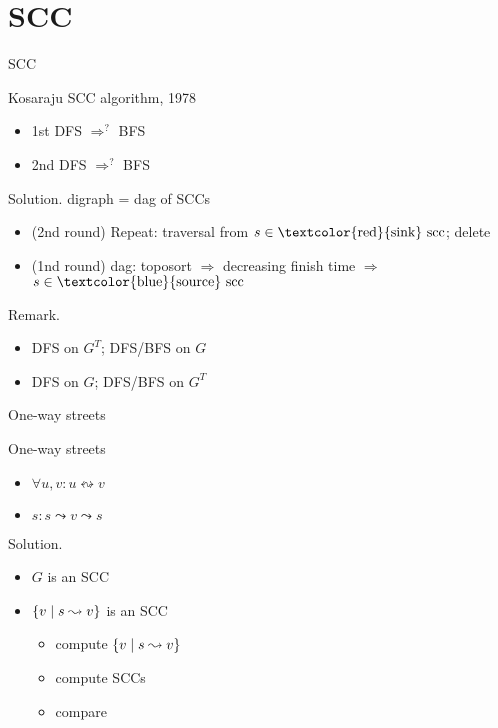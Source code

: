 \section{SCC}

\begin{frame}{SCC}
  \begin{exampleblock}{Kosaraju SCC algorithm, 1978 }
    \begin{itemize}
      \item 1st DFS $\Rightarrow^{?}$ BFS
      \item 2nd DFS $\Rightarrow^{?}$ BFS
    \end{itemize}
  \end{exampleblock}

  \begin{block}{Solution.}
    digraph = dag of SCCs
    \begin{itemize}
      \item (2nd round) Repeat: traversal from $s \in \text{\textcolor{red}{sink} scc}$; delete
      \item (1nd round) dag: toposort $\Rightarrow$ decreasing finish time $\Rightarrow$ $s \in \text{\textcolor{blue}{source} scc}$
    \end{itemize}
  \end{block}

  \begin{alertblock}{Remark.}
    \begin{itemize}
      \item DFS on $G^{T}$; DFS/BFS on $G$
      \item DFS on $G$; DFS/BFS on $G^{T}$
    \end{itemize}
  \end{alertblock}
\end{frame}
\begin{frame}{One-way streets}
  \begin{exampleblock}{One-way streets }
    \begin{itemize}
      \item $\forall u,v: u \leftrightsquigarrow v$
      \item $s: s \leadsto v \leadsto s$
    \end{itemize}
  \end{exampleblock}

  \begin{block}{Solution.}
    \begin{itemize}
      \item $G$ is an SCC
      \item $\{v \mid s \leadsto v\}$ is an SCC
	\begin{itemize}
	  \item compute $\{v \mid s \leadsto v\}$
	  \item compute SCCs
	  \item compare
	\end{itemize}
    \end{itemize}
  \end{block}
\end{frame}
